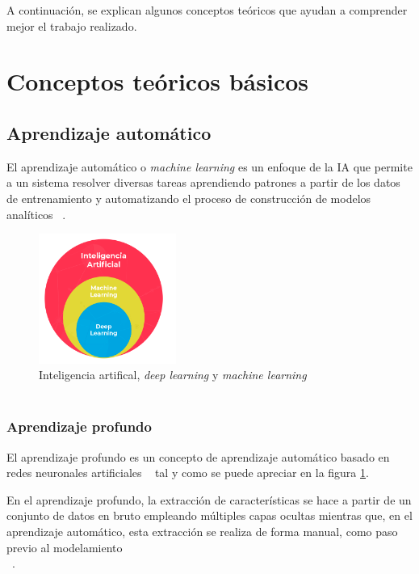 
A continuación, se explican algunos conceptos teóricos que ayudan a comprender mejor el trabajo realizado.

\section{Conceptos teóricos básicos}

\subsection{Aprendizaje automático}
El aprendizaje automático o \textit{machine learning} es un enfoque de la IA que permite a un sistema resolver diversas tareas aprendiendo patrones a partir de los datos de entrenamiento y automatizando el proceso de construcción de modelos analíticos ~\cite{janiesch2021machine}.

\begin{figure}[h]
    \centering
    \includegraphics[width=0.40\textwidth]{img/Aprendizaje automatico.png}
    \caption{Inteligencia artifical, \textit{deep learning} y \textit{machine learning}\\  ~\cite{UniMa24}}
    \label{fig:aprendizaje_automatico}
\end{figure}
\FloatBarrier

\subsubsection{Aprendizaje profundo}
El aprendizaje profundo es un concepto de aprendizaje automático basado en redes neuronales artificiales ~\cite{janiesch2021machine} tal y como se puede apreciar en la figura \ref{fig:aprendizaje_automatico}.

En el aprendizaje profundo, la extracción de características se hace a partir de un conjunto de datos en bruto empleando múltiples capas ocultas mientras que, en el aprendizaje automático, esta extracción se realiza de forma manual, como paso previo al modelamiento\\ ~\cite{diego23}. 

